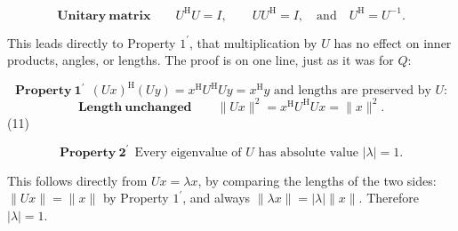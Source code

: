 \[\mathbf{Unitary\ matrix}\qquad U^{\mathrm{H}}U=I,\qquad UU^{\mathrm{H}}=I, \quad\text{and}\quad U^{\mathrm{H}}=U^{-1}.\]

This leads directly to Property \(1^{\prime}\), that multiplication by \(U\) has no effect on inner products, angles, or lengths. The proof is on one line, just as it was for \(Q\):

\[\mathbf{Property\ 1^{\prime}}\ \ (Ux)^{\mathrm{H}}(Uy)=x^{\mathrm{H}}U^{ \mathrm{H}}Uy=x^{\mathrm{H}}y\text{ and lengths are preserved by }U\text{:}\] \[\mathbf{Length\ unchanged}\qquad\|Ux\|^{2}=x^{\mathrm{H}}U^{ \mathrm{H}}Ux=\|x\|^{2}.\] (11)

\[\mathbf{Property\ 2^{\prime}}\ \ \text{Every eigenvalue of $U$ has absolute value $|\lambda|=1$.}\]

This follows directly from \(Ux=\lambda x\), by comparing the lengths of the two sides: \(\|Ux\|=\|x\|\) by Property \(1^{\prime}\), and always \(\|\lambda x\|=|\lambda|\|x\|\). Therefore \(|\lambda|=1\).

 